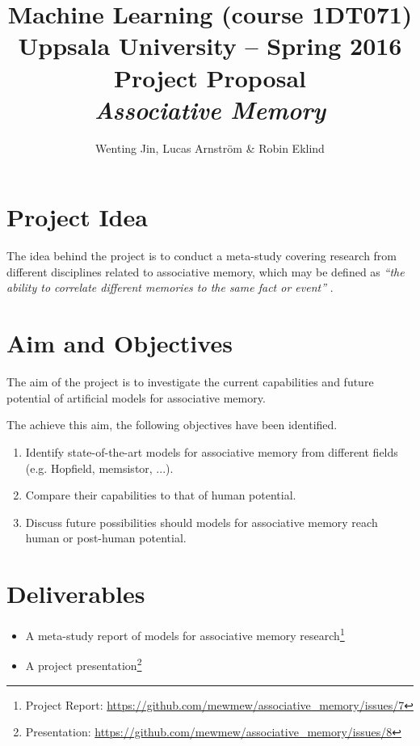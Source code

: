 \documentclass[12pt, a4paper]{article}
\title{\textbf{Machine Learning (course 1DT071) \\
    Uppsala University -- Spring 2016 \\
    Project Proposal \\
    \textit{Associative Memory}
  }
}
\author{Wenting Jin, Lucas Arnström \& Robin Eklind}
\begin{document}
\maketitle



\section{Project Idea} %



The idea behind the project is to conduct a meta-study covering research from different disciplines related to associative memory, which may be defined as \textit{``the ability to correlate different memories to the same fact or event''} \cite{memsistor}.

\section{Aim and Objectives}

The aim of the project is to investigate the current capabilities and future potential of artificial models for associative memory.

The achieve this aim, the following objectives have been identified.

\begin{enumerate}
	\item Identify state-of-the-art models for associative memory from different fields (e.g. Hopfield, memsistor, ...).
	\item Compare their capabilities to that of human potential.
	\item Discuss future possibilities should models for associative memory reach human or post-human potential.
\end{enumerate}

\section{Deliverables}

\begin{itemize}
	\item A meta-study report of models for associative memory research\footnote{Project Report: \url{https://github.com/mewmew/associative_memory/issues/7}}
	\item A project presentation\footnote{Presentation: \url{https://github.com/mewmew/associative_memory/issues/8}}
\end{itemize}
\end{document}
